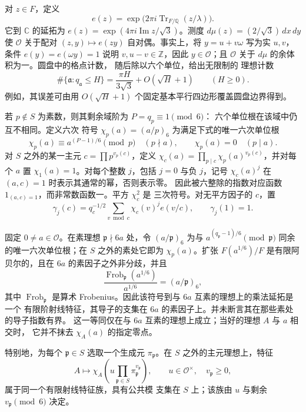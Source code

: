 对 $z\in F$，定义
\[
 e(z)=\exp\bigl(2\pi i\operatorname{Tr}_{F/\mathbb Q}(z/\lambda)\bigr).
\]
它到 $\mathbb C$ 的延拓为
$e(z)=\exp(4\pi i\operatorname{Im}z/\sqrt3)$。测度
$d\mu(z)=(2/\sqrt3)\,dx\,dy$ 使 $\mathcal O$ 关于配对
$(z,y)\mapsto e(zy)$ 自对偶。事实上，将 $y=u+v\omega$ 写为实 $u,v$，条件
$e(y)=e(\omega y)=1$ 说明 $v,u-v\in\mathbb Z$，因此
$y\in\mathcal O$；且 $\mathcal O$ 关于 $d\mu$ 的余体积为一。圆盘中的格点计数，
随后除以六个单位，给出无限制的
理想计数
\[
 \#\{\mathfrak a:q_{\mathfrak a}\le H\}
 =\frac{\pi H}{3\sqrt3}+O(\sqrt H+1)\qquad(H\ge0).
\]
例如，其误差可由用
$O(\sqrt H+1)$ 个固定基本平行四边形覆盖圆盘边界得到。

若 $p\notin S$ 为素数，则其剩余域阶为 $P=q_p\equiv1\pmod6$：
六个单位根在该域中仍互不相同。定义六次
符号 $\chi_p(a)=(a/p)_6$ 为满足下式的唯一六次单位根
\[
 \chi_p(a)\equiv a^{(P-1)/6}\pmod p\quad(p\nmid a),
 \qquad \chi_p(a)=0\quad(p\mid a).
\]
对 $S$ 之外的某一主元 $c=\prod p^{v_p(c)}$，定义
$\chi_c(a)=\prod_{p\mid c}\chi_p(a)^{v_p(c)}$，并对每个
$a$ 置 $\chi_1(a)=1$。对每个整数 $j$，包括 $j=0$ 与负 $j$，记号
$\chi_c(a)^j$ 在 $(a,c)=1$ 时表示其通常的幂，否则表示零。
因此被六整除的指数对应函数
$1_{(a,c)=1}$，而非常数函数一。平方 $\chi_c^2$ 是
三次符号。对无平方因子的 $c$，置
\[
 \gamma_j(c)=q_c^{-1/2}\sum_{v\bmod c}\chi_c(v)^j e(v/c),
 \qquad \gamma_j(1)=1.
\]

\begin{lemma}[固定分子给出射线特征]
\label{lem:fixed-numerator-ray}
固定 $0\ne a\in\mathcal O$。在素理想 $\mathfrak p\nmid6a$ 处，令
$(a/\mathfrak p)_6$ 为与
$a^{(q_{\mathfrak p}-1)/6}\pmod{\mathfrak p}$ 同余的唯一六次单位根；在 $S$ 之外的素处它即为
$\chi_p(a)$。扩张 $F(a^{1/6})/F$ 是有限阿贝尔的，且在
$6a$ 的素因子之外非分歧，并且
\[
 \frac{\operatorname{Frob}_{\mathfrak p}(a^{1/6})}{a^{1/6}}
       =(a/\mathfrak p)_6,
\]
其中 $\operatorname{Frob}_{\mathfrak p}$ 是算术 Frobenius。因此该符号到与 $6a$
互素的理想上的乘法延拓是一个
有限阶射线特征，其导子的支集在
$6a$ 的素因子上。并未断言其在那些素处的导子指数有界。
这一等同仅在与 $6a$ 互素的理想上成立；当好的理想 $A$ 与 $a$ 相交时，
它并不抹去 $\chi_A(a)$ 的指定零点。

特别地，为每个
$\mathfrak p\in S$ 选取一个生成元 $\pi_{\mathfrak p}$。在 $S$ 之外的主元理想上，特征
\[
 A\longmapsto\chi_A\left(u\prod_{\mathfrak p\in S}
                       \pi_{\mathfrak p}^{v_{\mathfrak p}}\right),
 \qquad u\in\mathcal O^\times,\quad v_{\mathfrak p}\ge0,
\]
属于同一个有限射线特征族，具有公共模
支集在 $S$ 上；该族由 $u$ 与剩余
$v_{\mathfrak p}\pmod6$ 决定。
\end{lemma}

